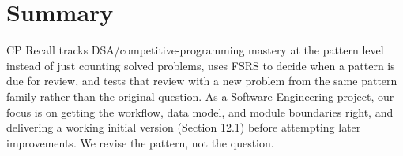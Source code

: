 \documentclass[11pt,a4paper]{article}
\begin{document}
\section{Summary}
CP Recall tracks DSA/competitive-programming mastery at the pattern level instead of just counting solved problems, uses FSRS to decide when a pattern is due for review, and tests that review with a new problem from the same pattern family rather than the original question. As a Software Engineering project, our focus is on getting the workflow, data model, and module boundaries right, and delivering a working initial version (Section 12.1) before attempting later improvements. We revise the pattern, not the question.
\end{document}
